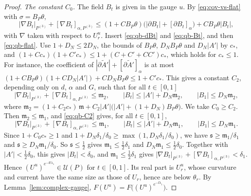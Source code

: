 \begin{proof}
\emph{The constant $C_0$.} The field $B_t$ is given in the gauge $u$. By \eqref{eq:cov-vs-flat} with $\sigma=B_P\theta$,
\[
|\nabla B_t|_{P^{(3)}}+[\nabla B_t]_{\alpha,P^{(3)}}\le(1+CB_P\theta)\big(|\partial B_t|+[\partial B_t]_\alpha\big)+CB_P\theta|B_t| ,
\]
with $\nabla$ taken with respect to $U_r^u$. Insert \eqref{eq:qb-dBt} and \eqref{eq:qb-Bt}, and then \eqref{eq:qb-flat}. Use $1+D_N\le2D_N$, the bounds of $B_P\theta$, $D_NB_P\theta$ and $D_N|A'|$ by $c_*$, and $(1+Cc_*)(1+C'c_*)\le1+(C+C'+CC')c_*$, which holds for $c_*\le1$. For instance, the coefficient of $|\partial\tilde A'|+[\partial\tilde A']_\alpha$ is at most $(1+CB_P\theta)(1+CD_N|A'|)+CD_NB_P\theta\le1+C'c_*$. This gives a constant $C_2$, depending only on $d$, $\alpha$ and $G$, such that for all $t\in[0,1]$
\begin{equation}\label{eq:qb-C2}
|\nabla B_t|_{P^{(3)}}+[\nabla B_t]_{\alpha,P^{(3)}}\le\mathfrak m_2,\qquad|B_t|\le|A'|+D_N\mathfrak m_2,\qquad|B_1|\le D_N\mathfrak m_2,
\end{equation}
where $\mathfrak m_2=(1+C_2c_*)\,\mathfrak m+C_2|A'|\big(|A'|+(1+D_N)B_P\theta\big)$. We take $C_0\ge C_2$. Then $\mathfrak m_2\le\mathfrak m_1$, and \eqref{eq:qb-C2} gives, for all $t\in[0,1]$,
\[
|\nabla B_t|_{P^{(3)}}+[\nabla B_t]_{\alpha,P^{(3)}}\le\mathfrak m_1,\qquad|B_t|\le|A'|+D_N\mathfrak m_1,\qquad|B_1|\le D_N\mathfrak m_1 .
\]
Since $1+C_0c_*\ge1$ and $1+D_N\delta_1/\delta_0\ge\max(1,D_N\delta_1/\delta_0)$, we have $\mathfrak s\ge\mathfrak m_1/\delta_1$ and $\mathfrak s\ge D_N\mathfrak m_1/\delta_0$. So $\mathfrak s\le\frac12$ gives $\mathfrak m_1\le\frac12\delta_1$ and $D_N\mathfrak m_1\le\frac12\delta_0$. Together with $|A'|<\frac12\delta_0$, this gives $|B_t|<\delta_0$, and $\mathfrak m_1\le\frac12\delta_1$ gives $|\nabla B_t|_{P^{(3)}}+[\nabla B_t]_{\alpha,P^{(3)}}<\delta_1$. Hence $(U^u)^{e^{-\ii t\lambda_1}}\in\mathcal U(P)$ for $t\in[0,1]$. Its real part is $U_r^u$, whose curvature and current have the same size as those of $U_r$, hence are below $\theta_r$. By Lemma~\ref{lem:complex-gauge}, $F(U^u)=F\big((U^u)^{e^{-\ii\lambda_1}}\big)$.


\end{proof}

